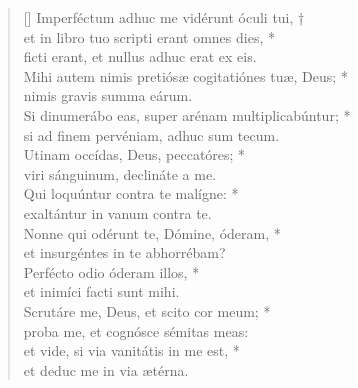 \begin{verse}[\versewidth]
Imperféctum adhuc me vidérunt óculi tui, †\\
et in libro tuo scripti erant omnes dies, *\\
ficti erant, et nullus adhuc erat ex eis.\\
Mihi autem nimis pretiósæ cogitatiónes tuæ, Deus; *\\
nimis gravis summa eárum.\\
Si dinumerábo eas, super arénam multiplicabúntur; *\\
si ad finem pervéniam, adhuc sum tecum.\\
Utinam occídas, Deus, peccatóres; *\\
viri sánguinum, declináte a me.\\
Qui loquúntur contra te malígne: *\\
exaltántur in vanum contra te.\\
Nonne qui odérunt te, Dómine, óderam, *\\
et insurgéntes in te abhorrébam?\\
Perfécto odio óderam illos, *\\
et inimíci facti sunt mihi.\\
Scrutáre me, Deus, et scito cor meum; *\\
proba me, et cognósce sémitas meas:\\
et vide, si via vanitátis in me est, *\\
et deduc me in via ætérna.\\
\end{verse}
\vspace{1cm}


